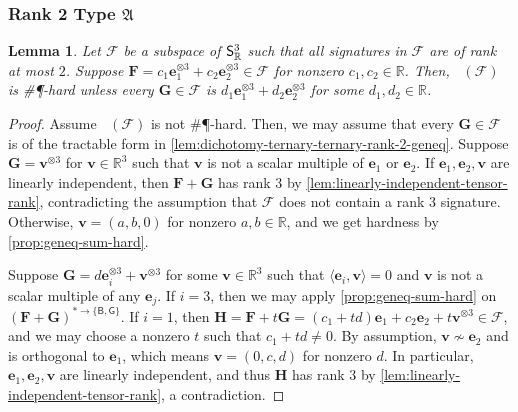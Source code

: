\documentclass[11pt]{article}
\newtheorem{lemma}[theorem]{Lemma}
\DeclareMathOperator{\holts}{Holant^*_3}
\newcommand{\db}{\mathsf{B}}
\newcommand{\dg}{\mathsf{G}}
\newcommand{\sph}{\#\P-hard\xspace}
\newcommand{\teh}{^{\otimes 3}}
\newcommand{\domres}[1]{
  ^{*\to\{#1\}}
}
\newcommand{\ternarytractgeneq}{$\mathfrak{A}$\xspace}
\begin{document}
\subsubsection{Rank 2 Type \texorpdfstring{\ternarytractgeneq}{A}}
\begin{lemma}\label{lem:dichotomy-subspace-rank-2-geneq}
Let $\mathscr{F}$ be a subspace of $\mathsf{S}^3_{\mathbb{R}}$ such that all signatures in $\mathscr{F}$ are of rank at most $2$.
  Suppose $\mathbf{F} = c_1 \mathbf{e}_1 \teh + c_2 \mathbf{e}_2\teh \in \mathscr{F}$ for nonzero $c_1, c_2 \in \mathbb{R}$.
  Then, $\holts(\mathscr{F})$ is \sph unless every $\mathbf{G} \in \mathscr{F}$ is $d_1 \mathbf{e}_1 \teh + d_2 \mathbf{e}_2\teh$ for some $d_1, d_2 \in \mathbb{R}$.
\end{lemma}
\begin{proof}
Assume $\holts(\mathscr{F})$ is not \sph.
  Then, we may assume that every $\mathbf{G} \in \mathscr{F}$ is of the tractable form in \cref{lem:dichotomy-ternary-ternary-rank-2-geneq}.
  Suppose $\mathbf{G} = \mathbf{v}\teh$ for $\mathbf{v} \in \mathbb{R}^3$ such that $\mathbf{v}$ is not a scalar multiple of $\mathbf{e}_1$ or $\mathbf{e}_2$.
  If $\mathbf{e}_1, \mathbf{e}_2, \mathbf{v}$ are linearly independent, then $\mathbf{F} + \mathbf{G}$ has rank $3$ by \cref{lem:linearly-independent-tensor-rank}, contradicting the assumption that $\mathscr{F}$ does not contain a rank $3$ signature.
  Otherwise, $\mathbf{v} = (a, b, 0)$ for nonzero $a, b \in \mathbb{R}$, and we get hardness by \cref{prop:geneq-sum-hard}.

  Suppose $\mathbf{G} = d \mathbf{e}_i \teh + \mathbf{v}\teh$ for some $\mathbf{v} \in \mathbb{R}^3$ such that $\langle \mathbf{e}_i, \mathbf{v} \rangle = 0$ and $\mathbf{v}$ is not a scalar multiple of any $\mathbf{e}_j$.
  If $i = 3$, then we may apply \cref{prop:geneq-sum-hard} on $(\mathbf{F} + \mathbf{G})\domres{\db, \dg}$.
  If $i = 1$, then $\mathbf{H} = \mathbf{F} + t \mathbf{G} = (c_1 + td) \mathbf{e}_1 + c_2 \mathbf{e}_2 + t \mathbf{v}\teh \in \mathscr{F}$, and we may choose a nonzero $t$ such that $c_1 + td \ne 0$.
  By assumption, $\mathbf{v} \not \sim \mathbf{e}_2$ and is orthogonal to $\mathbf{e}_1$, which means $\mathbf{v} = (0, c, d)$ for nonzero $d$.
  In particular, $\mathbf{e}_1, \mathbf{e}_2, \mathbf{v}$ are linearly independent, and thus $\mathbf{H}$ has rank $3$ by \cref{lem:linearly-independent-tensor-rank}, a contradiction.


\end{proof}
\end{document}
